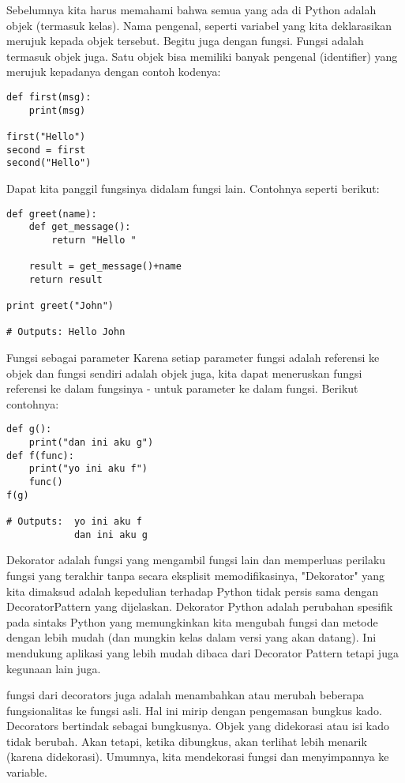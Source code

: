 \documentclass[12pt,a4paper]{article}
\begin{document}
Sebelumnya kita harus memahami bahwa semua yang ada di Python adalah objek (termasuk kelas). Nama pengenal, seperti variabel yang kita deklarasikan merujuk kepada objek tersebut. Begitu juga dengan fungsi. Fungsi adalah termasuk objek juga. Satu objek bisa memiliki banyak pengenal (identifier) yang merujuk kepadanya dengan contoh kodenya:

\begin{verbatim}
def first(msg):
    print(msg)

first("Hello")
second = first
second("Hello")
\end{verbatim}

Dapat kita panggil fungsinya didalam fungsi lain.
Contohnya seperti berikut:
\begin{verbatim}
def greet(name):
    def get_message():
        return "Hello "

    result = get_message()+name
    return result

print greet("John")

# Outputs: Hello John
\end{verbatim}

Fungsi sebagai parameter
Karena setiap parameter fungsi adalah referensi ke objek dan fungsi sendiri adalah objek juga, kita dapat meneruskan fungsi referensi ke dalam fungsinya - untuk parameter ke dalam fungsi.
Berikut contohnya: 
\begin{verbatim}
def g():
    print("dan ini aku g")
def f(func):
    print("yo ini aku f")
    func() 
f(g)

# Outputs: 	yo ini aku f
			dan ini aku g
\end{verbatim}


Dekorator adalah fungsi yang mengambil fungsi lain dan memperluas perilaku fungsi yang terakhir tanpa secara eksplisit memodifikasinya, "Dekorator" yang kita dimaksud adalah kepedulian terhadap Python tidak persis sama dengan DecoratorPattern yang dijelaskan. Dekorator Python adalah perubahan spesifik pada sintaks Python yang memungkinkan kita mengubah fungsi dan metode dengan lebih mudah (dan mungkin kelas dalam versi yang akan datang). Ini mendukung aplikasi yang lebih mudah dibaca dari Decorator Pattern tetapi juga kegunaan lain juga.

fungsi dari decorators juga adalah menambahkan atau merubah beberapa fungsionalitas ke fungsi asli. Hal ini mirip dengan pengemasan bungkus kado. Decorators bertindak sebagai bungkusnya. Objek yang didekorasi atau isi kado tidak berubah. Akan tetapi, ketika dibungkus, akan terlihat lebih menarik (karena didekorasi). Umumnya, kita mendekorasi fungsi dan menyimpannya ke variable.
\end{document}
